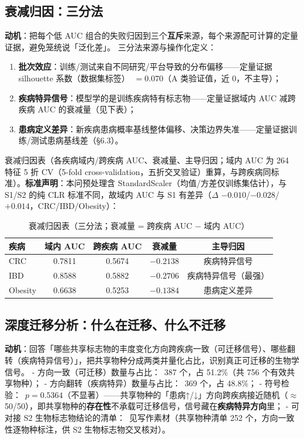 \documentclass{internal-report}
\begin{document}
\subsection{衰减归因：三分法}
\textbf{动机}：把每个低 AUC 组合的失败归因到三个\textbf{互斥}来源，每个来源配可计算的定量证据，避免笼统说「泛化差」。
三分法来源与操作化定义：
\begin{enumerate}
  \item \textbf{批次效应}：训练/测试来自不同研究/平台导致的分布偏移——定量证据 silhouette 系数（数据集标签）\ $=0.070$（A 类验证值，近 0，不主导）；
  \item \textbf{疾病特异信号}：模型学的是训练疾病特有标志物——定量证据域内 AUC 减跨疾病 AUC 的衰减量（见下表）；
  \item \textbf{患病定义差异}：新疾病患病概率基线整体偏移、决策边界失准——定量证据训练/测试患病基线差（§6.3）。
\end{enumerate}

衰减归因表（各疾病域内/跨疾病 AUC、衰减量、主导归因；域内 AUC 为 264 特征 5 折 CV（5-fold cross-validation，五折交叉验证）重算，与跨疾病同标准）。\textbf{标准声明}：本问预处理含 StandardScaler（均值/方差仅训练集估计），与 S1/S2 的纯 CLR 标准不同，故域内 AUC 与 S1 有差异（$\Delta$ $-0.010$/$-0.028$/$+0.014$，CRC/IBD/Obesity）：
\begin{table}[ht]
\centering
\caption{衰减归因表（三分法；衰减量 = 跨疾病 AUC $-$ 域内 AUC）}
\begin{tabular}{l c c c c}
\toprule
\textbf{疾病} & \textbf{域内 AUC} & \textbf{跨疾病 AUC} & \textbf{衰减量} & \textbf{主导归因} \\
\midrule
CRC & 0.7811 & 0.5674 & $-0.2138$ & 疾病特异信号 \\
IBD & 0.8588 & 0.5882 & $-0.2706$ & 疾病特异信号（最强） \\
Obesity & 0.6638 & 0.5253 & $-0.1384$ & 患病定义差异 \\
\bottomrule
\end{tabular}
\label{tab:decay-attribution}
\end{table}


\subsection{深度迁移分析：什么在迁移、什么不迁移}
\textbf{动机}：回答「哪些共享标志物的丰度变化方向跨疾病一致（可迁移信号）、哪些翻转（疾病特异信号）」，把共享物种分成两类并量化占比，识别真正可迁移的生物学信号。
- 方向一致（可迁移）数量与占比：\ 387 个，占 51.2\%（共 756 个有效共享物种）；
- 方向翻转（疾病特异）数量与占比：\ 369 个，占 48.8\%；
- 符号检验：\ $p=0.5364$（不显著）——共享物种的「患病↑/↓」方向跨疾病接近随机（$\approx$50/50），即共享物种的\textbf{存在性}不承载可迁移信号，信号藏在\textbf{疾病特异方向}里；
- 可对接 S2 生物标志物结论的清单：\ 见写作素材（共享物种清单 252 个，方向一致性逐物种标注，供 S2 生物标志物交叉核对）。
\end{document}
